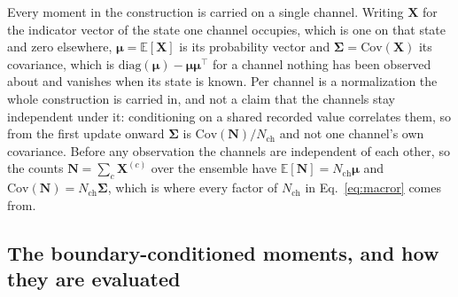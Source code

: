\begin{appendixbox}
Every moment in the construction is carried on a single channel. Writing $\mathbf{X}$ for the
indicator vector of the state one channel occupies, which is one on that state and zero
elsewhere, $\boldsymbol{\mu}=\mathbb{E}[\mathbf{X}]$ is its probability vector and
$\boldsymbol{\Sigma}=\mathrm{Cov}(\mathbf{X})$ its covariance, which is
$\mathrm{diag}(\boldsymbol{\mu})-\boldsymbol{\mu}\boldsymbol{\mu}^\top$ for a channel nothing has been observed about
and vanishes when its state is known. Per channel is a normalization the whole construction is
carried in, and not a claim that the channels stay independent under it: conditioning on a shared
recorded value correlates them, so from the first update onward $\boldsymbol{\Sigma}$ is
$\mathrm{Cov}(\mathbf{N})/N_{\mathrm{ch}}$ and not one channel's own covariance. Before any
observation the channels are independent of each other, so the counts
$\mathbf{N}=\sum_c \mathbf{X}^{(c)}$ over the ensemble have
$\mathbb{E}[\mathbf{N}]=N_{\mathrm{ch}}\boldsymbol{\mu}$ and
$\mathrm{Cov}(\mathbf{N})=N_{\mathrm{ch}}\boldsymbol{\Sigma}$, which is where every factor of
$N_{\mathrm{ch}}$ in Eq.~\ref{eq:macror} comes from.



\subsection*{The boundary-conditioned moments, and how they are evaluated}


\end{appendixbox}
